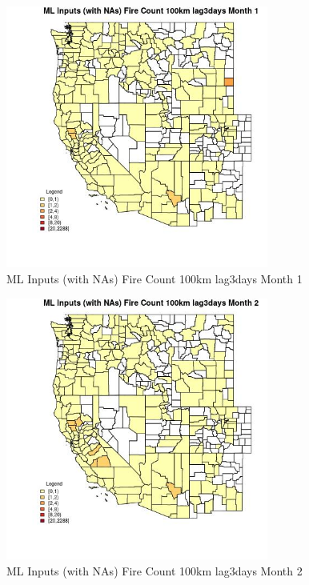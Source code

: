 \begin{figure} 
\centering  
\includegraphics[width=0.77\textwidth]{Code_Outputs/Report_ML_input_PM25_Step4_part_e_de_duplicated_aves_compiled_2019-05-20wNAs_CountyFire_Count_100km_lag3daysmedianMonth1.jpg} 
\caption{\label{fig:Report_ML_input_PM25_Step4_part_e_de_duplicated_aves_compiled_2019-05-20wNAsCountyFire_Count_100km_lag3daysmedianMonth1}ML Inputs (with NAs) Fire Count 100km lag3days Month 1} 
\end{figure} 
 

\begin{figure} 
\centering  
\includegraphics[width=0.77\textwidth]{Code_Outputs/Report_ML_input_PM25_Step4_part_e_de_duplicated_aves_compiled_2019-05-20wNAs_CountyFire_Count_100km_lag3daysmedianMonth2.jpg} 
\caption{\label{fig:Report_ML_input_PM25_Step4_part_e_de_duplicated_aves_compiled_2019-05-20wNAsCountyFire_Count_100km_lag3daysmedianMonth2}ML Inputs (with NAs) Fire Count 100km lag3days Month 2} 
\end{figure} 
 

